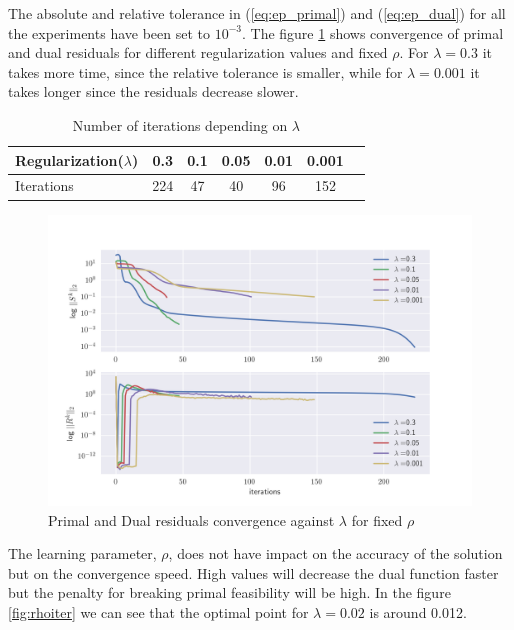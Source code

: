 The absolute and relative tolerance in (\ref{eq:ep_primal}) and (\ref{eq:ep_dual}) for all the experiments have been set to $10^{-3}$. The figure \ref{fig:convlambda} shows convergence of primal and dual residuals for different regularization values and fixed $\rho$. For $\lambda = 0.3$ it takes more time, since the relative tolerance is smaller, while for $\lambda = 0.001$ it takes longer since the residuals decrease slower.  
\begin{table}[h]
	\centering
	\begin{tabular}{l*{5}{c}r}
		Regularization($\lambda$)& 0.3 & 0.1 & 0.05 & 0.01 & 0.001 \\
		\hline
		Iterations & 224 & 47 & 40 & 96 & 152   \\
	\end{tabular}
	\label{tab:iterlambda}
	\caption{Number of iterations depending on $\lambda$}
\end{table}

\begin{figure}[H]
	\centering
	\includegraphics[width=\textwidth]{figures/convergence_lambda.png}
	\caption{Primal and Dual residuals convergence against $\lambda$ for fixed $\rho$}
	\label{fig:convlambda}
\end{figure}

The learning parameter, $\rho$, does not have impact on the accuracy of the solution but on the convergence speed. High values will decrease the dual function faster but the penalty for breaking primal feasibility will be high. In the figure \ref{fig:rhoiter}  we can see that the optimal point for $\lambda = 0.02$ is around 0.012.

